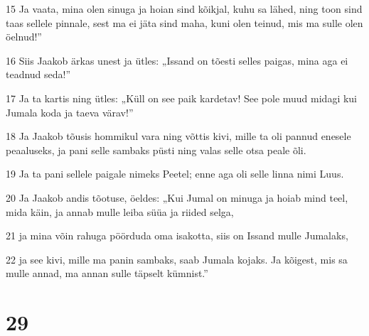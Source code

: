 \par 15 Ja vaata, mina olen sinuga ja hoian sind kõikjal, kuhu sa lähed, ning toon sind taas sellele pinnale, sest ma ei jäta sind maha, kuni olen teinud, mis ma sulle olen öelnud!”
\par 16 Siis Jaakob ärkas unest ja ütles: „Issand on tõesti selles paigas, mina aga ei teadnud seda!”
\par 17 Ja ta kartis ning ütles: „Küll on see paik kardetav! See pole muud midagi kui Jumala koda ja taeva värav!”
\par 18 Ja Jaakob tõusis hommikul vara ning võttis kivi, mille ta oli pannud enesele peaaluseks, ja pani selle sambaks püsti ning valas selle otsa peale õli.
\par 19 Ja ta pani sellele paigale nimeks Peetel; enne aga oli selle linna nimi Luus.
\par 20 Ja Jaakob andis tõotuse, öeldes: „Kui Jumal on minuga ja hoiab mind teel, mida käin, ja annab mulle leiba süüa ja riided selga,
\par 21 ja mina võin rahuga pöörduda oma isakotta, siis on Issand mulle Jumalaks,
\par 22 ja see kivi, mille ma panin sambaks, saab Jumala kojaks. Ja kõigest, mis sa mulle annad, ma annan sulle täpselt kümnist.”

\chapter{29}

